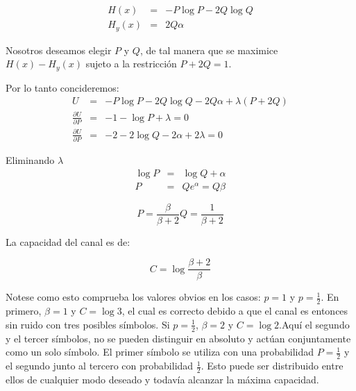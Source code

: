 \begin{equation}
\begin{array}{rcl}
H(x) &=& -P\log{P} - 2Q\log{Q} \\
H_y(x) &=& 2Q\alpha
\end{array}
\end{equation}

Nosotros deseamos elegir $P$ y $Q$, de tal manera que se maximice
$H(x) - H_y(x)$ sujeto a la restricci\'on $P + 2Q = 1$.

Por lo tanto concideremos:
\begin{equation}
\begin{array}{rcl}
U &=& -P\log{P} - 2Q\log{Q} -2Q\alpha + \lambda(P+2Q) \\
\frac{{\partial U}}{{\partial P}} &=& -1 - \log{P} + \lambda = 0 \\
\frac{{\partial U}}{{\partial P}} &=& -2 - 2\log{Q} -2\alpha + 2\lambda = 0
\end{array}
\end{equation}

Eliminando $\lambda$
\begin{equation}
\begin{array}{rcl}
\log{P} &=& \log{Q} + \alpha \\
P &=& Q e^\alpha = Q\beta 
\end{array}
\end{equation}

\begin{equation}
	P = \frac{\beta}{\beta + 2}   Q = \frac{1}{\beta + 2}
\end{equation}

La capacidad del canal es de:

\begin{equation}
	C = \log{\frac{\beta + 2}{\beta}}
\end{equation}

Notese como esto comprueba los valores obvios en los casos: $p = 1$ y $p = \frac{1}{2}$. En primero, $\beta = 1$ y $C = \log{3}$, 
el cual es correcto debido a que el canal es entonces sin ruido con tres posibles s\'imbolos. Si $p = \frac{1}{2}$, $\beta = 2$ y 
$C = \log{2}$.Aqu\'i el segundo y el tercer s\'imbolos, no se pueden distinguir en absoluto y act\'uan conjuntamente como un solo 
s\'imbolo. El primer s\'imbolo se utiliza con una probabilidad $P = \frac{1}{2}$  y el segundo junto al tercero con probabilidad $\frac{1}{2}$.
Esto puede ser distribuido entre ellos de cualquier modo deseado y todav\'ia alcanzar la m\'axima capacidad.


